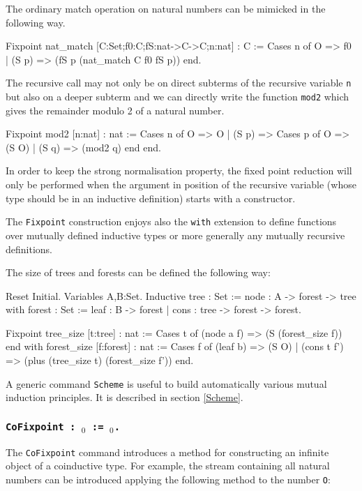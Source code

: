 The ordinary match operation on natural numbers can be mimicked in the
following way.
\begin{coq_example*}
Fixpoint nat_match [C:Set;f0:C;fS:nat->C->C;n:nat] : C 
   := Cases n of O => f0 | (S p) => (fS p (nat_match C f0 fS p)) end.
\end{coq_example*}
The recursive call may not only be on direct subterms of the recursive
variable {\tt n} but also on a deeper subterm and we can directly
write the function {\tt mod2} which gives the remainder modulo 2 of a
natural number.
\begin{coq_example*}
Fixpoint mod2 [n:nat] : nat
   := Cases n of
         O    => O
      | (S p) => Cases p of O => (S O) | (S q) => (mod2 q) end
      end.
\end{coq_example*}
In order to keep the strong normalisation property, the fixed point
reduction will only be performed when the argument in position of the
recursive variable (whose type should be in an inductive definition)
starts with a constructor.

The {\tt Fixpoint} construction enjoys also the {\tt with} extension
to define functions over mutually defined inductive types or more
generally any mutually recursive definitions.

\Example 
The size of trees and forests can be defined the following way: 
\begin{coq_eval}
Reset Initial.
Variables A,B:Set.
Inductive tree : Set :=  node : A -> forest -> tree
with forest : Set := leaf : B -> forest 
                   | cons : tree -> forest -> forest.
\end{coq_eval}
\begin{coq_example*}
Fixpoint tree_size [t:tree] : nat :=
    Cases t of (node a f) => (S (forest_size f)) end
with forest_size [f:forest] : nat := 
    Cases f of (leaf b) => (S O)
          | (cons t f') => (plus (tree_size t) (forest_size f')) 
         end.
\end{coq_example*}
A generic command {\tt Scheme} is useful to build automatically various
mutual induction principles. It is described in section \ref{Scheme}.

\subsubsection{\tt CoFixpoint {\ident} :
\type$_0$ := \term$_0$.}\label{CoFixpoint}

The {\tt CoFixpoint} command introduces a method for constructing an
infinite object of a coinduc\-tive type. For example, the stream
containing all natural numbers can be introduced applying the
following method to the number \texttt{O}:

